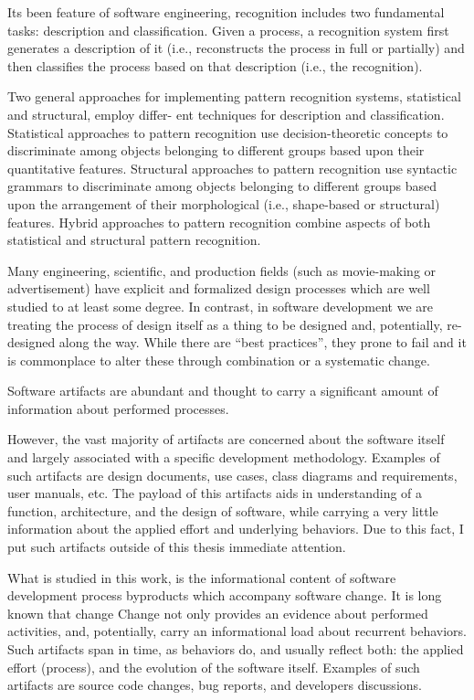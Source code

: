 \documentclass[11pt,oneside]{article}
\numberwithin{equation}{subsection}
\begin{document}
Its been \cite{citeulike:11061107}
feature of software engineering, recognition includes two fundamental tasks: description and classification. Given
a process, a recognition system first generates a description of it (i.e., reconstructs the process in
full or partially) and then classifies the process based on that description (i.e., the recognition).

Two general approaches for implementing pattern recognition systems, statistical and structural, employ differ-
ent techniques for description and classification. Statistical approaches to pattern recognition use
decision-theoretic concepts to discriminate among objects belonging to different groups based upon
their quantitative features. Structural approaches to pattern recognition use syntactic grammars
to discriminate among objects belonging to different groups based upon the arrangement of their
morphological (i.e., shape-based or structural) features. Hybrid approaches to pattern recognition
combine aspects of both statistical and structural pattern recognition.

Many engineering, scientific, and production fields (such as movie-making or advertisement) have explicit 
and formalized design processes which are well studied to at least some degree. In contrast, in software 
development we are treating the process of design itself as a thing to be designed and, potentially, 
re-designed along the way. While there are ``best practices'', they prone to fail and it is commonplace
to alter these through combination or a systematic change.



Software artifacts are abundant and thought to carry a significant amount of information about performed 
processes.

However, the vast majority of artifacts are concerned about the software itself and largely associated 
with a specific development methodology. Examples of such artifacts are design documents, use cases, class 
diagrams and requirements, user manuals, etc. The payload of this artifacts aids in understanding of 
a function, architecture, and the design of software, while carrying a very little information about the 
applied effort and underlying behaviors. Due to this fact, I put such artifacts outside of this thesis
immediate attention.

What is studied in this work, is the informational content of software development process byproducts 
which accompany software change. It is long known that change Change not only provides an evidence about performed activities, and, potentially, 
carry an informational load about
recurrent behaviors. Such artifacts span in time, as behaviors do, and usually reflect both: the applied 
effort (process), and the evolution of the software itself. 
Examples of such artifacts are source code changes, bug reports, and developers discussions.
\end{document}
